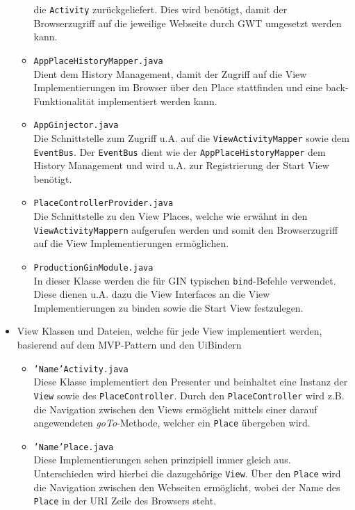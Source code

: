 \begin{itemize}
\begin{itemize}
    die \texttt{Activity} zurückgeliefert. Dies wird benötigt, damit der
    Browserzugriff auf die jeweilige Webseite durch GWT umgesetzt werden kann.
    \item \texttt{AppPlaceHistoryMapper.java}\\
    Dient dem History Management, damit der Zugriff auf die View
    Implementierungen im Browser über den Place stattfinden und eine
    back-Funktionalität implementiert werden kann.
    \item \texttt{AppGinjector.java}\\
    Die Schnittstelle zum Zugriff u.A. auf die
    \texttt{ViewActivityMapper} sowie dem \texttt{EventBus}. Der
    \texttt{EventBus} dient wie der \texttt{AppPlaceHistoryMapper} dem
    History Management und wird u.A. zur Registrierung der Start View benötigt.
    \item \texttt{PlaceControllerProvider.java}\\
    Die Schnittstelle zu den View Places, welche wie erwähnt in
    den \texttt{ViewActivityMappern} aufgerufen werden und somit den
    Browserzugriff auf die View Implementierungen ermöglichen.
    \item \texttt{ProductionGinModule.java}\\
    In dieser Klasse werden die für GIN typischen \texttt{bind}-Befehle
    verwendet. Diese dienen u.A. dazu die View Interfaces an die View
    Implementierungen zu binden sowie die Start View festzulegen.
  \end{itemize}  
  \item View Klassen und Dateien, welche für jede View implementiert werden,
  basierend auf dem MVP-Pattern und den UiBindern
    \begin{itemize}
    \item \texttt{'Name'Activity.java}\\
    Diese Klasse implementiert den Presenter und beinhaltet
    eine Instanz der \texttt{View} sowie des \texttt{PlaceController}.
    Durch den \texttt{PlaceController} wird z.B. die Navigation zwischen den Views
    ermöglicht mittels einer darauf angewendeten \textit{goTo}-Methode, welcher
 	ein \texttt{Place} übergeben wird.
    \item \texttt{'Name'Place.java}\\
    Diese Implementierungen sehen prinzipiell immer gleich aus. Unterschieden
    wird hierbei die dazugehörige \texttt{View}. Über den \texttt{Place} wird
    die Navigation zwischen den Webseiten ermöglicht, wobei der Name des
    \texttt{Place} in der URI Zeile des Browsers steht.

\end{itemize}
\end{itemize}
